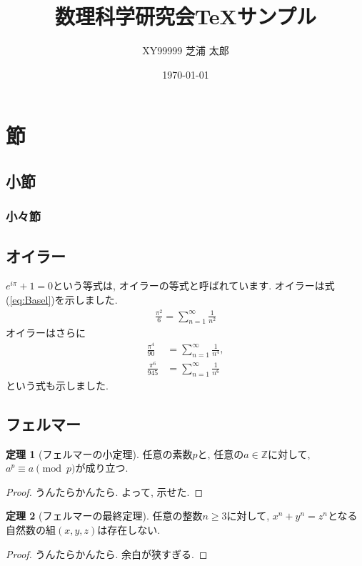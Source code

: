 \documentclass[a4paper, 12pt, dvipdfmx]{jsarticle}
\title{数理科学研究会\TeX サンプル}
\date{\today}
\author{XY99999 \quad 芝浦 太郎}
\theoremstyle{definition}
\newtheorem{theorem}{定理}[section]
\begin{document}
\maketitle



\section{節}
\subsection{小節}
\subsubsection{小々節}

\subsection{オイラー}
$e^{i\pi}+1=0$という等式は, オイラーの等式と呼ばれています.
オイラーは式 (\ref{eq:Basel})を示しました.
\begin{align}
    \frac{\pi^2}{6}=\sum_{n=1}^\infty \frac{1}{n^2} \label{eq:Basel}
\end{align}
オイラーはさらに
\begin{align*}
    \frac{\pi^4}{90}&=\sum_{n=1}^\infty \frac{1}{n^4},\\
    \frac{\pi^6}{945}&=\sum_{n=1}^\infty \frac{1}{n^6}
\end{align*}
という式も示しました.

\subsection{フェルマー}
\begin{theorem}[フェルマーの小定理]
    任意の素数$p$と, 任意の$a\in \mathbb{Z}$に対して, $a^p\equiv a \pmod{p}$が成り立つ.
\end{theorem}
\begin{proof}
    うんたらかんたら.
    よって, 示せた.
\end{proof}
\begin{theorem}[フェルマーの最終定理]
    任意の整数$n\geq 3$に対して, $x^n+y^n=z^n$となる自然数の組$(x,y,z)$は存在しない.
\end{theorem}
\begin{proof}
    うんたらかんたら.
    余白が狭すぎる.
\end{proof}
\end{document}
